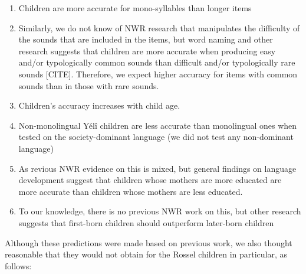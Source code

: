 \documentclass[english,,man,floatsintext]{apa6}
\providecommand{\tightlist}{%
  \setlength{\itemsep}{0pt}\setlength{\parskip}{0pt}}
\begin{document}
\begin{enumerate}
\def\labelenumi{\arabic{enumi}.}
\tightlist
\item
  Children are more accurate for mono-syllables than longer items
\item
  Similarly, we do not know of NWR research that manipulates the difficulty of the sounds that are included in the items, but word naming and other research suggests that children are more accurate when producing easy and/or typologically common sounds than difficult and/or typologically rare sounds {[}CITE{]}. Therefore, we expect higher accuracy for items with common sounds than in those with rare sounds.
\item
  Children's accuracy increases with child age.
\item
  Non-monolingual Yélî children are less accurate than monolingual ones when tested on the society-dominant language (we did not test any non-dominant language)
\item
  As revious NWR evidence on this is mixed, but general findings on language development suggest that children whose mothers are more educated are more accurate than children whose mothers are less educated.
\item
  To our knowledge, there is no previous NWR work on this, but other research suggests that first-born children should outperform later-born children
\end{enumerate}

Although these predictions were made based on previous work, we also thought reasonable that they would not obtain for the Rossel children in particular, as follows:
\end{document}
